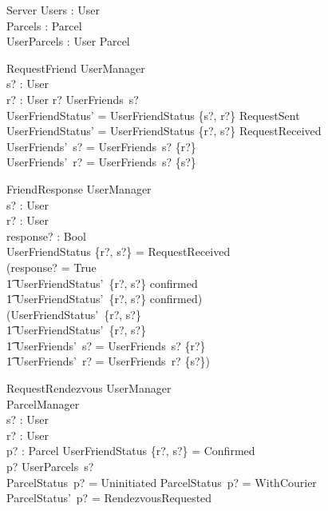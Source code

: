 \documentclass{article}
\begin{document}
\begin{schema}{Server}
	Users : \power User \\
	Parcels : \power Parcel \\
	UserParcels : User \mapsto \power Parcel\\
	\where
\end{schema}

\begin{schema}{RequestFriend}
	\Delta UserManager\\
	s? : User\\
	r? : User
	\where
	r? \notin UserFriends~s?\\
	UserFriendStatus' = UserFriendStatus \cup \{s?, r?\} \mapsto RequestSent\\
	UserFriendStatus' = UserFriendStatus \cup \{r?, s?\} \mapsto RequestReceived\\
	UserFriends'~s? = UserFriends~s? \cup \{r?\}\\
	UserFriends'~r? = UserFriends~s? \cup \{s?\}
\end{schema}

\begin{schema}{FriendResponse}
	\Delta UserManager\\
	s? : User\\
	r? : User\\
	response? : Bool\\
	\where
	UserFriendStatus \{r?, s?\} = RequestReceived\\
	(response? = True \land\\ 
		\t1 UserFriendStatus'~\{r?, s?\} \mapsto confirmed \land\\ 
		\t1 UserFriendStatus'~\{r?, s?\} \mapsto confirmed)\\
	\lor (UserFriendStatus'~\{r?, s?\} \mapsto \emptyset \land\\ 
		\t1 UserFriendStatus'~\{r?, s?\} \mapsto \emptyset \land\\
		\t1 UserFriends'~s? = UserFriends~s? \setminus \{r?\} \land\\
		\t1 UserFriends'~r? = UserFriends~r? \setminus \{s?\})
\end{schema}

\begin{schema}{RequestRendezvous}
	\Delta UserManager\\
	\Delta ParcelManager\\
	s? : User\\
	r? : User\\
	p? : Parcel
	\where
	UserFriendStatus \{r?, s?\} = Confirmed\\
	p? \in UserParcels~s?\\
	ParcelStatus~p? = Uninitiated \lor ParcelStatus~p? = WithCourier\\
	ParcelStatus'~p? = RendezvousRequested
\end{schema}
\end{document}
